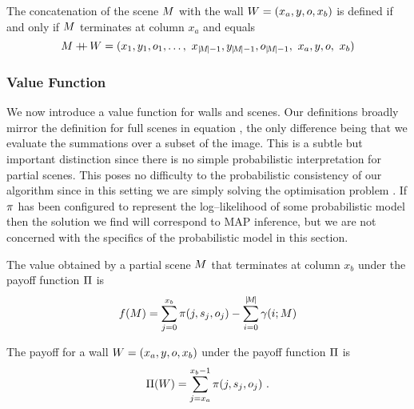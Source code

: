 \begin{definition}
  \label{def:concatenation}
  The concatenation of the scene $\PartialScene$ with the wall
  $\Wall=(x_a,y,\WallOrient,x_b)$ is defined if and only if
  $\PartialScene$ terminates at column $x_a$ and equals
  \begin{equation}
    \PartialScene \concat \Wall = 
    ( x_1,y_1,\WallOrient_1,
    \ldots,
    ~x_{\SceneLen-1},y_{\SceneLen-1},\WallOrient_{\SceneLen-1},
    ~x_a, y, \WallOrient, ~ x_b )
  \end{equation}
\end{definition}

\subsubsection{Value Function}

We now introduce a value function for walls and scenes. Our
definitions broadly mirror the definition for full scenes in equation
, the only difference being that we evaluate the
summations over a subset of the image. This is a subtle but important
distinction since there is no simple probabilistic
interpretation for partial scenes. This poses no difficulty to the
probabilistic consistency of our algorithm since in this setting we are
simply solving the optimisation problem . If
$\PixelPayoff$ has been configured to represent the log--likelihood of
some probabilistic model then the solution we find will correspond to
MAP inference, but we are not concerned with the specifics of the
probabilistic model in this section.

\begin{definition}
  \label{def:scene-value}
  The value obtained by a partial scene $\PartialScene$ that
  terminates at column $x_b$ under the payoff function $\ScenePayoff$
  is
  \begin{equation}
    \Objective(\PartialScene) = \sum_{j=0}^{x_b} 
      \PixelPayoff(j,\seam_j,\WallOrient_j) - 
      \sum_{i=0}^{\SceneLen} \CornerPenalty(i;\PartialScene)
    \label{eq:scene-value}
  \end{equation}
\end{definition}

\begin{definition}
  \label{def:wall-value}
  The payoff for a wall $\Wall=(x_a,y,\WallOrient,x_b)$ under the
  payoff function $\ScenePayoff$ is
  \begin{equation}
    \WallPayoff(\Wall) = \sum_{j=x_a}^{x_b-1}
      \PixelPayoff(j,\seam_j,\WallOrient_j) ~.
  \end{equation}
\end{definition}

